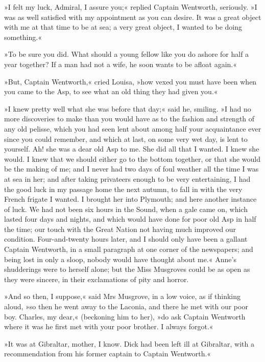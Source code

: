 »I felt my luck, Admiral, I assure you;« replied Captain Wentworth, seriously. »I was as well satisfied with my appointment as you can desire. It was a great object with me at that time to be at sea; a very great object, I wanted to be doing something.«

»To be sure you did. What should a young fellow like you do ashore for half a year together? If a man had not a wife, he soon wants to be afloat again.«

»But, Captain Wentworth,« cried Louisa, »how vexed you must have been when you came to the Asp, to see what an old thing they had given you.«

»I knew pretty well what she was before that day;« said he, smiling. »I had no more discoveries to make than you would have as to the fashion and strength of any old pelisse, which you had seen lent about among half your acquaintance ever since you could remember, and which at last, on some very wet day, is lent to yourself. Ah! she was a dear old Asp to me. She did all that I wanted. I knew she would. I knew that we should either go to the bottom together, or that she would be the making of me; and I never had two days of foul weather all the time I was at sea in her; and after taking privateers enough to be very entertaining, I had the good luck in my passage home the next autumn, to fall in with the very French frigate I wanted. I brought her into Plymouth; and here another instance of luck. We had not been six hours in the Sound, when a gale came on, which lasted four days and nights, and which would have done for poor old Asp in half the time; our touch with the Great Nation not having much improved our condition. Four-and-twenty hours later, and I should only have been a gallant Captain Wentworth, in a small paragraph at one corner of the newspapers; and being lost in only a sloop, nobody would have thought about me.« Anne's shudderings were to herself alone; but the Miss Musgroves could be as open as they were sincere, in their exclamations of pity and horror.

»And so then, I suppose,« said Mrs Musgrove, in a low voice, as if thinking aloud, »so then he went away to the Laconia, and there he met with our poor boy. Charles, my dear,« (beckoning him to her), »do ask Captain Wentworth where it was he first met with your poor brother. I always forgot.«

»It was at Gibraltar, mother, I know. Dick had been left ill at Gibraltar, with a recommendation from his former captain to Captain Wentworth.«


